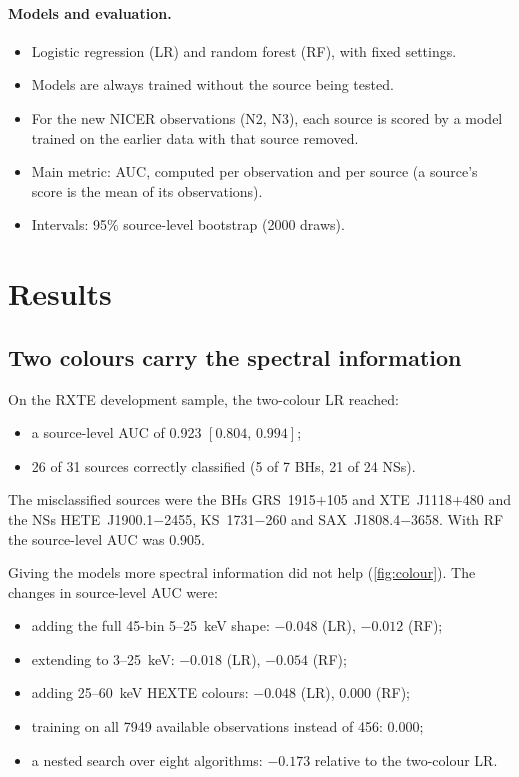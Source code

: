 \documentclass[11pt,a4paper]{article}
\newcommand{\ci}[2]{$[#1,\,#2]$}
\begin{document}
\paragraph{Models and evaluation.}
\begin{itemize}[leftmargin=1.4em]
\item Logistic regression (LR) and random forest (RF), with fixed settings.
\item Models are always trained without the source being tested.
\item For the new NICER observations (N2, N3), each source is scored by a model trained on the earlier data with that
source removed.
\item Main metric: AUC, computed per observation and per source (a source's score is the mean of its observations).
\item Intervals: 95\% source-level bootstrap (2000 draws).
\end{itemize}

\section{Results}

\subsection{Two colours carry the spectral information}
On the RXTE development sample, the two-colour LR reached:
\begin{itemize}[leftmargin=1.4em]
\item a source-level AUC of 0.923 \ci{0.804}{0.994};
\item 26 of 31 sources correctly classified (5 of 7 BHs, 21 of 24 NSs).
\end{itemize}
The misclassified sources were the BHs GRS~1915$+$105 and XTE~J1118$+$480 and the NSs HETE~J1900.1$-$2455,
KS~1731$-$260 and SAX~J1808.4$-$3658. With RF the source-level AUC was 0.905.

Giving the models more spectral information did not help (\cref{fig:colour}). The changes in source-level AUC were:
\begin{itemize}[leftmargin=1.4em]
\item adding the full 45-bin 5--25~keV shape: $-0.048$ (LR), $-0.012$ (RF);
\item extending to 3--25~keV: $-0.018$ (LR), $-0.054$ (RF);
\item adding 25--60~keV HEXTE colours: $-0.048$ (LR), $0.000$ (RF);
\item training on all 7949 available observations instead of 456: $0.000$;
\item a nested search over eight algorithms: $-0.173$ relative to the two-colour LR.
\end{itemize}
\end{document}
